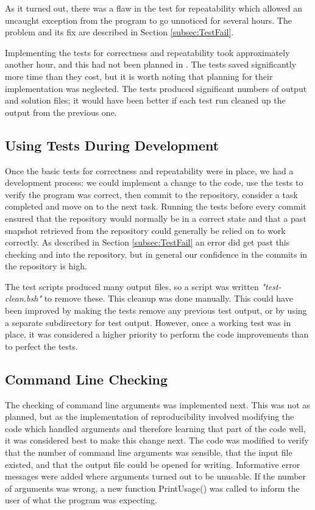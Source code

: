 \documentclass[11pt, oneside]{article}   %
\begin{document}
As it turned out, there was a flaw in the test for repeatability which allowed an uncaught exception from the program to go unnoticed for several hours.
The problem and its fix are described in Section \ref{subsec:TestFail}.

Implementing the tests for correctness and repeatability took approximately another hour, and this had not been planned in \cite{ref:Part-I}.
The tests saved significantly more time than they cost, but it is worth noting that planning for their implementation was neglected.
The tests produced significant numbers of output and solution files; it would have been better if each test run cleaned up the output from the previous one.

\subsection{Using Tests During Development}
Once the basic tests for correctness and repeatability were in place, we had a development process: we could implement a change to the code, use the tests to verify the program was correct, then commit to the repository, consider a task completed and move on to the next task.  Running the tests before every commit ensured that the repository would normally be in a correct state and that a past snapshot retrieved from the repository could generally be relied on to work correctly.  As described in Section \ref{subsec:TestFail} an error did get past this checking and into the repository, but in general our confidence in the commits in the repository is high.

The test scripts produced many output files, so a script was written {\em "test-clean.bsh"} to remove these.
This cleanup was done manually.
This could have been improved by making the tests remove any previous test output, or by using a separate subdirectory for test output.
However, once a working test was in place, it was considered a higher priority to perform the code improvements than to perfect the tests.

\subsection{Command Line Checking}
The checking of command line arguments was implemented next.
This was not as planned, but as the implementation of reproducibility involved modifying the code which handled arguments and therefore learning that part of the code well, it was considered best to make this change next.
The code was modified to verify that the number of command line arguments was sensible, that the input file existed, and that the output file could be opened for writing.
Informative error messages were added where arguments turned out to be unusable.
If the number of arguments was wrong, a new function PrintUsage() was called to inform the user of what the program was expecting.
\end{document}
